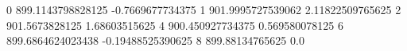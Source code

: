 0 899.1143798828125 -0.7669677734375
1 901.9995727539062 2.11822509765625
2 901.5673828125 1.68603515625
4 900.450927734375 0.569580078125
6 899.6864624023438 -0.19488525390625
8 899.88134765625 0.0
